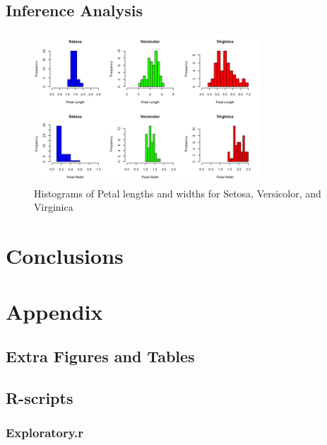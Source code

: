 \documentclass{article}
\begin{document}
\color{teal}
\subsection{Inference Analysis}

\begin{figure}[H]
	\centering
	\includegraphics[width=0.75\textwidth]{hist_iris.png}
	\caption{Histograms of Petal lengths and widths for Setosa, Versicolor, and
	Virginica}
	\label{fig:hist_iris}
\end{figure}

\section{Conclusions}

\color{black}
\newpage
\section{Appendix}

\subsection{Extra Figures and Tables} 
\subsection{R-scripts}
\subsubsection{Exploratory.r}
\end{document}
